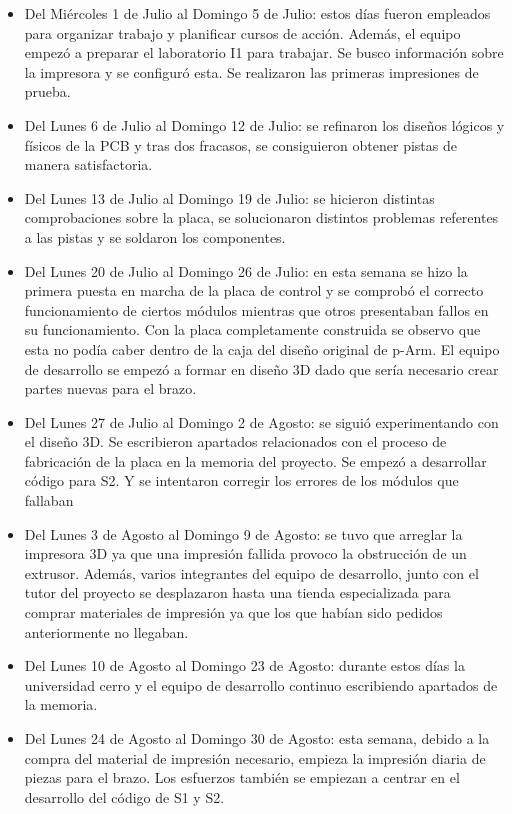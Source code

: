 \begin{itemize}
    \item Del Miércoles 1 de Julio al Domingo 5 de Julio: estos días fueron empleados para organizar trabajo y planificar cursos de acción. Además, el equipo empezó a preparar el laboratorio I1 para trabajar. Se busco información sobre la impresora y se configuró esta. Se realizaron las primeras impresiones de prueba.
    \item Del Lunes 6 de Julio al Domingo 12 de Julio:
    se refinaron los diseños lógicos y físicos de la PCB y tras dos fracasos, se consiguieron obtener pistas de manera satisfactoria.
    \item Del Lunes 13 de Julio al Domingo 19 de Julio: se hicieron distintas comprobaciones sobre la placa, se solucionaron distintos problemas referentes a las pistas y se soldaron los componentes. 
    \item Del Lunes 20 de Julio al Domingo 26 de Julio: en esta semana se hizo la primera puesta en marcha de la placa de control y se comprobó el correcto funcionamiento de ciertos módulos mientras que otros presentaban fallos en su funcionamiento.
    Con la placa completamente construida se observo que esta no podía caber dentro de la caja del diseño original de p-Arm. El equipo de desarrollo se empezó a formar en diseño 3D dado que sería necesario crear partes nuevas para el brazo.
    \item Del Lunes 27 de Julio al Domingo 2 de Agosto: se siguió experimentando con el diseño 3D. Se escribieron apartados relacionados con el proceso de fabricación de la placa en la memoria del proyecto. Se empezó a desarrollar código para \ac{S2}. Y se intentaron corregir los errores de los módulos que fallaban
    \item Del Lunes 3 de Agosto al Domingo 9 de Agosto: se tuvo que arreglar la impresora 3D ya que una impresión fallida provoco la obstrucción de un extrusor. Además, varios integrantes del equipo de desarrollo, junto con el tutor del proyecto se desplazaron hasta una tienda especializada para comprar materiales de impresión ya que los que habían sido pedidos anteriormente no llegaban.
    \item Del Lunes 10 de Agosto al Domingo 23 de Agosto:
    durante estos días la universidad cerro y el equipo de desarrollo continuo escribiendo apartados de la memoria.
    \item Del Lunes 24 de Agosto al Domingo 30 de Agosto:
    esta semana, debido a la compra del material de impresión necesario, empieza la impresión diaria de piezas para el brazo. Los esfuerzos también se empiezan a centrar en el desarrollo del código de \ac{S1} y \ac{S2}.
    
\end{itemize}
    

